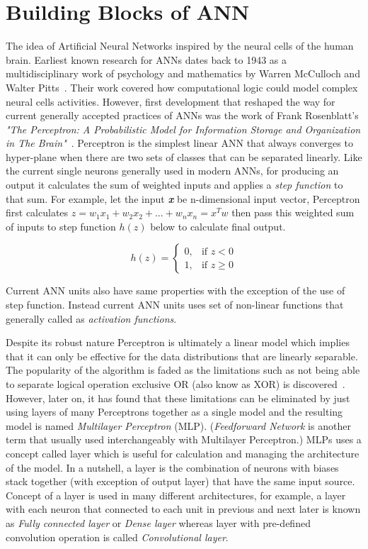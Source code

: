 \section{Building Blocks of ANN} \label{sec:bbann}
The idea of Artificial Neural Networks inspired by the neural cells of the human brain. Earliest known research for ANNs dates back to 1943 as a multidisciplinary work of psychology and mathematics by Warren McCulloch and Walter Pitts~\cite{firstann}. Their work covered how computational logic could model complex neural cells activities. However, first development that reshaped the way for current generally accepted practices of ANNs was the work of Frank Rosenblatt's  \emph{"The Perceptron: A Probabilistic Model for Information Storage and Organization in The Brain"}~\cite{perceptron}. Perceptron is the simplest linear ANN that always converges to hyper-plane when there are two sets of classes that can be separated linearly. Like the current single neurons generally used in modern ANNs, for producing an output it calculates the sum of weighted inputs and applies a \emph{step function} to that sum. For example, let the input \textbf{\textit{x}} be n-dimensional input vector, Perceptron first calculates \(z = w_1x_1 + w_2x_2 + \ldots + w_nx_n = x^Tw\) then pass this weighted sum of inputs to step function \(h(z)\) below to calculate final output. 

\begin{equation} \label{eq:stepfunc21}
h(z)=
\begin{cases}
    0, & \text{if } z< 0\\
    1, & \text{if } z\geq 0
\end{cases}    
\end{equation}

Current ANN units also have same properties with the exception of the use of step function. Instead current ANN units uses set of non-linear functions that generally called as \emph{activation functions}. 

Despite its robust nature Perceptron is ultimately a linear model which implies that it can only be effective for the data distributions that are linearly separable.
The popularity of the algorithm is faded as the limitations such as not being able to separate logical operation exclusive OR (also know as XOR) is discovered~\cite{marvinperceptrons}.
However, later on, it has found that these limitations can be eliminated by just using layers of many Perceptrons together as a single model and the resulting model is named \emph{Multilayer Perceptron} (MLP). 
(\emph{Feedforward Network} is another term that usually used interchangeably with Multilayer Perceptron.)
MLPs uses a concept called layer which is useful for calculation and managing the architecture of the model.
In a nutshell, a layer is the combination of neurons with biases stack together (with exception of output layer) that have the same input source.
Concept of a layer is used in many different architectures, for example, a layer with each neuron that connected to each unit in previous and next later is known as \emph{Fully connected layer} or \emph{Dense layer} whereas layer with pre-defined convolution operation is called \emph{Convolutional layer}. 

